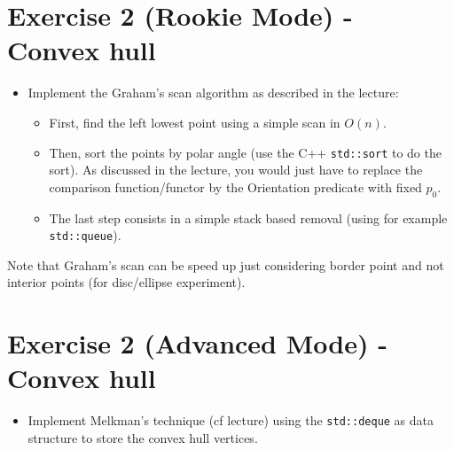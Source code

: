 \documentclass[a4paper, 11pt]{article}
\begin{document}
\section*{Exercise 2 (Rookie Mode) - \rm Convex hull}

\begin{itemize}
	\item Implement the Graham's scan algorithm as described in the lecture:
		\begin{itemize}
        \item First, find the left lowest point using a simple scan in $O(n)$.
        \item Then, sort the points by polar angle (use the C++ \texttt{std::sort} to do the sort).
            As discussed in the lecture, you would just have to replace the comparison function/functor by the Orientation predicate with fixed $p_0$.
		\item The last step consists in a simple stack based removal (using for example \texttt{std::queue}).
		\end{itemize}
\end{itemize}

\par Note that Graham's scan can be speed up just considering border point and not interior points (for disc/ellipse experiment).

\section*{Exercise 2 (Advanced Mode) - \rm Convex hull}

\begin{itemize}
	\item Implement Melkman's technique (cf lecture) using the \texttt{std::deque} as data structure to store the convex hull vertices.
\end{itemize}
\end{document}
